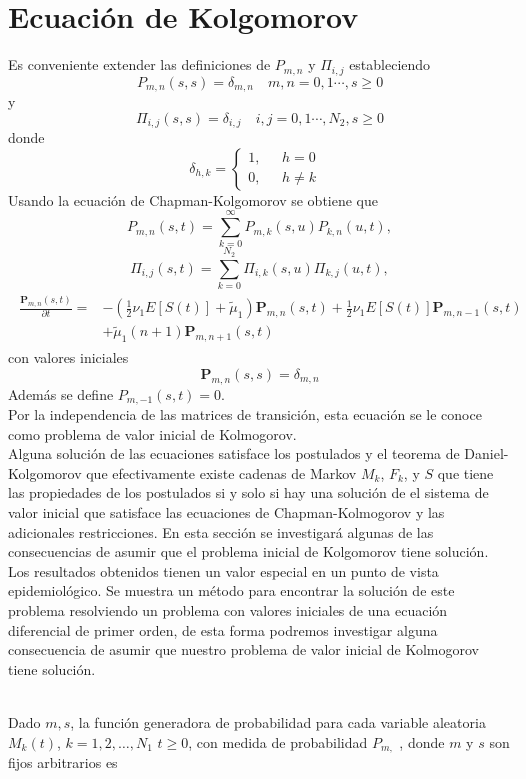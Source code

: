 \section{Ecuación de Kolgomorov}
Es conveniente extender las definiciones de $P_{m,n}$ y $\Pi_{i,j}$ estableciendo $$P_{m,n}(s,s)=\delta_{m,n}\quad m,n=0,1\cdots, s\geq 0$$
y
$$\Pi_{i,j}(s,s)=\delta_{i,j}\quad i,j=0,1\cdots,N_2, s\geq 0$$
donde 
$$\delta_{h,k}=
    \begin{cases}
    1, & \mbox{ $h=0$ } \\
    0, & \mbox{ $h\not=k$}
    \end{cases}$$
Usando la ecuación de Chapman-Kolgomorov se obtiene que
$$P_{m,n}(s,t)=\sum_{k=0}^\infty P_{m,k}(s,u)P_{k,n}(u,t),$$
$$\Pi_{i,j}(s,t)=\sum_{k=0}^{N_2} \Pi_{i,k}(s,u)\Pi_{k,j}(u,t),$$
\begin{eqnarray}
    \begin{array}{cr}
        \frac{\mathbf{P}_{m,n}(s,t)}{\partial t}= & -(\frac{1}{2}\nu_1E[S(t)]+\tilde{\mu}_1)\mathbf{P}_{m,n}(s,t)+\frac{1}{2}\nu_1E[S(t)]\mathbf{P}_{m,n-1}(s,t) \\
         & +\tilde{\mu}_1 (n+1)\mathbf{P}_{m,n+1}(s,t)
    \end{array}
    \label{derivatePartial_P_t}
\end{eqnarray}
con valores iniciales $$\mathbf{P}_{m,n}(s,s)=\delta_{m,n}$$
Además se define $P_{m,-1}(s,t)=0 $.\\
Por la independencia de las matrices de transición, esta ecuación se le conoce como problema de valor inicial de Kolmogorov.\\ Alguna solución de las ecuaciones satisface los postulados y el teorema de Daniel-Kolgomorov que efectivamente existe cadenas de Markov $M_k$, $F_k$, y $S$ que tiene las propiedades de los postulados si y solo si hay una solución de el sistema de valor inicial que satisface las ecuaciones de Chapman-Kolmogorov y las adicionales restricciones.
En esta sección se investigará algunas de las consecuencias de asumir que el problema inicial de Kolgomorov tiene solución. Los resultados obtenidos tienen un valor especial en un punto de vista epidemiológico. Se muestra un método para encontrar la solución de este problema resolviendo un problema con valores iniciales de una ecuación diferencial de primer orden, de esta forma podremos investigar alguna consecuencia de asumir que nuestro problema de valor inicial de Kolmogorov tiene solución.

\\Dado $m,s$, la función generadora de probabilidad para cada variable aleatoria $M_k(t)$, $k=1,2,\ldots,N_1$ $t\geq 0$, con medida de probabilidad $P_{m,}$ , donde $m$ y $s$ son fijos arbitrarios es

